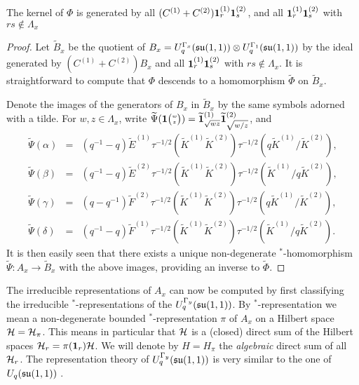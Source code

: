 \begin{Lem}\label{LemKer} The kernel of $\Phi$ is generated by all $(C^{(1)}+C^{(2)})\mathbf{1}_r^{(1)}\mathbf{1}_s^{(2)}$, and all $\mathbf{1}_r^{(1)}\mathbf{1}_s^{(2)}$ with $rs\notin \Lambda_x$
\end{Lem} 
\begin{proof} Let $\widetilde{B}_x$ be the quotient of $B_x = U_q^{\Gamma_x}(\mathfrak{su}(1,1))\otimes U_q^{\Gamma_1}(\mathfrak{su}(1,1))$ by the ideal generated by $(C^{(1)}+C^{(2)})B_x$ and all $\mathbf{1}_r^{(1)}\mathbf{1}_s^{(2)}$ with $rs\notin \Lambda_x$. It is straightforward to compute that $\Phi$ descends to a homomorphism $\widetilde{\Phi}$ on $\widetilde{B}_x$. 

Denote the images of the generators of $B_x$ in $\widetilde{B}_x$ by the same symbols adorned with a tilde. For $w,z\in \Lambda_x$, write $\widetilde{\Psi}(\mathbf{1}{\tiny {\begin{pmatrix} w\\z\end{pmatrix}}}) = \widetilde{\mathbf{1}}_{\sqrt{wz}}^{(1)}\widetilde{\mathbf{1}}_{\sqrt{w/z}}^{(2)}$, and \begin{eqnarray*} 
\widetilde{\Psi}(\alpha) &=& (q^{-1}-q)\widetilde{E}^{(1)}\tau^{-1/2}(\widetilde{K}^{(1)}\widetilde{K}^{(2)})\tau^{-1/2}(q\widetilde{K}^{(1)}/\widetilde{K}^{(2)}),\\ 
\widetilde{\Psi}(\beta) &=& (q^{-1}-q)\widetilde{E}^{(2)}\tau^{-1/2}(\widetilde{K}^{(1)}\widetilde{K}^{(2)})\tau^{-1/2}(\widetilde{K}^{(1)}/q\widetilde{K}^{(2)}),\\ 
\widetilde{\Psi}(\gamma) &=& (q-q^{-1})\widetilde{F}^{(2)}\tau^{-1/2}(\widetilde{K}^{(1)}\widetilde{K}^{(2)})\tau^{-1/2}(q\widetilde{K}^{(1)}/\widetilde{K}^{(2)}),\\
\widetilde{\Psi}(\delta) &=&  (q^{-1}-q)\widetilde{F}^{(1)}\tau^{-1/2}(\widetilde{K}^{(1)}\widetilde{K}^{(2)})\tau^{-1/2}(\widetilde{K}^{(1)}/q\widetilde{K}^{(2)}).
\end{eqnarray*}
It is then easily seen that there exists a unique non-degenerate $^*$-homomorphism $\widetilde{\Psi}: A_x\rightarrow \widetilde{B}_x$ with the above images, providing an inverse to $\widetilde{\Phi}$.
\end{proof}

The irreducible representations of $A_x$ can now be computed by first classifying the irreducible $^*$-representations of the $U_q^{\Gamma_y}(\mathfrak{su}(1,1))$. By $^*$-representation we mean a non-degenerate bounded $^*$-representation $\pi$ of $A_x$ on a Hilbert space $\mathcal{H} = \mathcal{H}_{\pi}$. This means in particular that $\mathcal{H}$ is a (closed) direct sum of the Hilbert spaces $\mathcal{H}_r = \pi(\mathbf{1}_r)\mathcal{H}$. We will denote by $H = H_{\pi}$ the \emph{algebraic} direct sum of all $\mathcal{H}_r$. The representation theory of $U_q^{\Gamma_y}(\mathfrak{su}(1,1))$ is very similar to the one of $U_q(\mathfrak{su}(1,1))$ \cite{MMNNSU1}.

